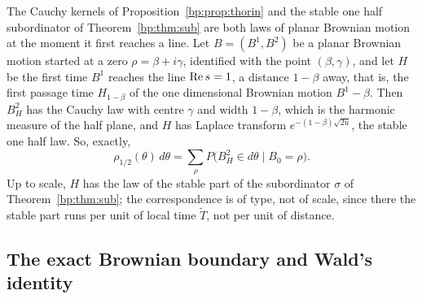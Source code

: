 \label{bp:sec:planar}The Cauchy kernels of Proposition~\ref{bp:prop:thorin} and the stable one half subordinator of Theorem~\ref{bp:thm:sub} are both laws of planar Brownian motion at the moment it first reaches a line. Let $B=(B^1,B^2)$ be a planar Brownian motion started at a zero $\rho=\beta+i\gamma$, identified with the point $(\beta,\gamma)$, and let $H$ be the first time $B^1$ reaches the line $\operatorname{Re} s=1$, a distance $1-\beta$ away, that is, the first passage time $H_{1-\beta}$ of the one dimensional Brownian motion $B^1-\beta$. Then $B^2_H$ has the Cauchy law with centre $\gamma$ and width $1-\beta$, which is the harmonic measure of the half plane, and $H$ has Laplace transform $e^{-(1-\beta)\sqrt{2u}}$, the stable one half law. So, exactly,
\[
\rho_{1/2}(\theta)\,d\theta=\sum_\rho P\big(B^2_H\in d\theta\mid B_0=\rho\big).
\]
Up to scale, $H$ has the law of the stable part of the subordinator $\sigma$ of Theorem~\ref{bp:thm:sub}; the correspondence is of type, not of scale, since there the stable part runs per unit of local time $\widetilde T$, not per unit of distance.

\subsection{The exact Brownian boundary and Wald's identity}\label{bp:sec:rs1}

